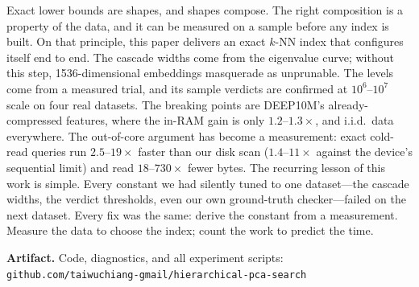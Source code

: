 \documentclass[sigconf, nonacm]{acmart}
\begin{document}
Exact lower bounds are shapes, and shapes compose. The right composition
is a property of the data, and it can be measured on a sample before any
index is built. On that principle, this paper delivers an exact $k$-NN
index that configures itself end to end. The cascade widths come from the
eigenvalue curve; without this step, 1536-dimensional embeddings
masquerade as unprunable. The levels come from a measured trial, and its
sample verdicts are confirmed at $10^6$--$10^7$ scale on four real
datasets. The breaking points are DEEP10M's already-compressed features,
where the in-RAM gain is only $1.2$--$1.3\times$, and i.i.d.\ data
everywhere. The out-of-core argument has become a measurement: exact
cold-read queries run $2.5$--$19\times$ faster than our disk scan
($1.4$--$11\times$ against the device's sequential limit) and read
$18$--$730\times$ fewer bytes.
The recurring lesson of this work is simple. Every constant we had
silently tuned to one dataset---the cascade widths, the verdict
thresholds, even our own ground-truth checker---failed on the next
dataset. Every fix was the same: derive the constant from a measurement.
Measure the data to choose the index; count the work to predict the time.

\vspace{1ex}
\noindent\textbf{Artifact.} Code, diagnostics, and all experiment scripts:\\
\texttt{github.com/taiwuchiang-gmail/hierarchical-pca-search}



\end{document}
